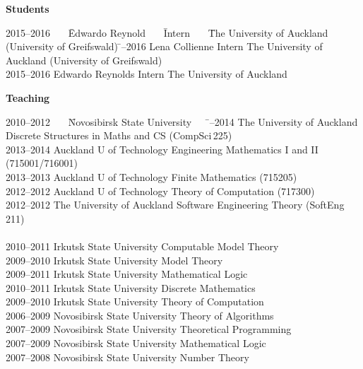 \documentclass[12pt]{article}
\begin{document}
\centerline{\bf Students}

\begin{tabbing}
2015--2016 \ \ \ 	\= Edwardo Reynold \ \ \ 	\= Intern \ \ \	\= The University of Auckland (University of Greifswald)	\= --2016      \> Lena Collienne       \> Intern       \> The University of Auckland (University of Greifswald)\\
2015--2016      \> Edwardo Reynolds	\> Intern       \> The University of Auckland\\
\end{tabbing}

\centerline{\bf Teaching}

\begin{tabbing}
2010--2012 \ \ \ \= Novosibirsk State University \ \ \ \= --2014        \> The University of Auckland             \> Discrete Structures in Maths and CS (CompSci\,225)\\
2013--2014       \> Auckland U of Technology       \> Engineering Mathematics I and II (715001/716001)\\
2013--2013       \> Auckland U of Technology       \> Finite Mathematics (715205)\\
2012--2012       \> Auckland U of Technology        \> Theory of Computation (717300)\\
2012--2012       \> The University of Auckland              \> Software Engineering Theory (SoftEng\,211)\\
\\
2010--2011       \> Irkutsk State University              \> Computable Model Theory\\
2009--2010       \> Irkutsk State University              \> Model Theory\\
2009--2011       \> Irkutsk State University              \> Mathematical Logic\\
2010--2011       \> Irkutsk State University              \> Discrete Mathematics\\
2009--2010       \> Irkutsk State University              \> Theory of Computation\\
2006--2009       \> Novosibirsk State University       \> Theory of Algorithms\\
2007--2009       \> Novosibirsk State University       \> Theoretical Programming\\
2007--2009       \> Novosibirsk State University       \> Mathematical Logic\\
2007--2008       \> Novosibirsk State University       \> Number Theory\\
\end{tabbing}
\end{document}
